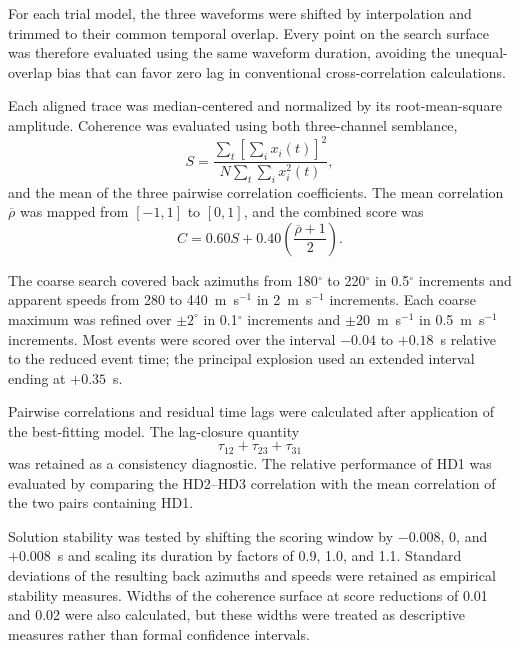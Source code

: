\documentclass[]{seismica}
\begin{document}
For each trial model, the three waveforms were shifted by interpolation and trimmed to their common temporal overlap. Every point on the search surface was therefore evaluated using the same waveform duration, avoiding the unequal-overlap bias that can favor zero lag in conventional cross-correlation calculations.

Each aligned trace was median-centered and normalized by its root-mean-square amplitude. Coherence was evaluated using both three-channel semblance,
\begin{equation}
  S = \frac{\sum_t\left[\sum_i x_i(t)\right]^2}{N\sum_t\sum_i x_i^2(t)},
  \label{eq:semblance}
\end{equation}
and the mean of the three pairwise correlation coefficients. The mean correlation $\overline{\rho}$ was mapped from $[-1,1]$ to $[0,1]$, and the combined score was
\begin{equation}
  C = 0.60S + 0.40\left(\frac{\overline{\rho}+1}{2}\right).
  \label{eq:coherence_score}
\end{equation}

The coarse search covered back azimuths from 180$^\circ$ to 220$^\circ$ in 0.5$^\circ$ increments and apparent speeds from 280 to 440~m~s$^{-1}$ in 2~m~s$^{-1}$ increments. Each coarse maximum was refined over $\pm2^\circ$ in 0.1$^\circ$ increments and $\pm20$~m~s$^{-1}$ in 0.5~m~s$^{-1}$ increments. Most events were scored over the interval $-0.04$ to $+0.18$~s relative to the reduced event time; the principal explosion used an extended interval ending at $+0.35$~s.

Pairwise correlations and residual time lags were calculated after application of the best-fitting model. The lag-closure quantity
\begin{equation}
  \tau_{12}+\tau_{23}+\tau_{31}
  \label{eq:lag_closure}
\end{equation}
was retained as a consistency diagnostic. The relative performance of HD1 was evaluated by comparing the HD2--HD3 correlation with the mean correlation of the two pairs containing HD1.

Solution stability was tested by shifting the scoring window by $-0.008$, 0, and $+0.008$~s and scaling its duration by factors of 0.9, 1.0, and 1.1. Standard deviations of the resulting back azimuths and speeds were retained as empirical stability measures. Widths of the coherence surface at score reductions of 0.01 and 0.02 were also calculated, but these widths were treated as descriptive measures rather than formal confidence intervals.
\end{document}

